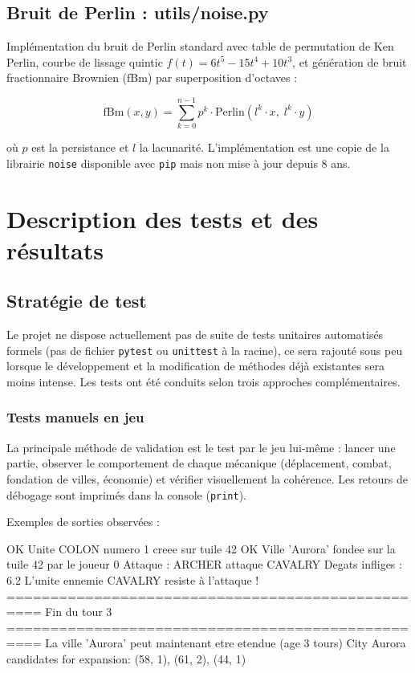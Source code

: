 \documentclass[12pt, a4paper]{article}
\begin{document}
\subsection{Bruit de Perlin : utils/noise.py}

Implémentation du bruit de Perlin standard avec table de permutation de Ken Perlin,
courbe de lissage quintic $f(t) = 6t^5 - 15t^4 + 10t^3$, et génération de bruit fractionnaire
Brownien (fBm) par superposition d'octaves :

\begin{equation}
    \text{fBm}(x, y) = \sum_{k=0}^{n-1} p^k \cdot \text{Perlin}\!\left(l^k \cdot x,\; l^k \cdot y\right)
\end{equation}

où $p$ est la persistance et $l$ la lacunarité. L'implémentation est une copie de la librairie \verb|noise| disponible avec \verb|pip| mais non mise à jour depuis 8 ans.



\section{Description des tests et des résultats}


\subsection{Stratégie de test}

Le projet ne dispose actuellement pas de suite de tests unitaires automatisés formels (pas de fichier
\texttt{pytest} ou \texttt{unittest} à la racine), ce sera rajouté sous peu lorsque le développement et la modification
de méthodes déjà existantes sera moins intense. Les tests ont été conduits selon trois approches complémentaires.

\subsubsection{Tests manuels en jeu}

La principale méthode de validation est le test par le jeu lui-même : lancer une partie,
observer le comportement de chaque mécanique (déplacement, combat, fondation de villes,
économie) et vérifier visuellement la cohérence. Les retours de débogage sont imprimés dans
la console (\texttt{print}).

Exemples de sorties observées :
\begin{myverbatim}[title={Messages de débogage en console}]
OK Unite COLON numero 1 creee sur tuile 42
OK Ville 'Aurora' fondee sur la tuile 42 par le joueur 0
Attaque : ARCHER attaque CAVALRY
   Degats infliges : 6.2
   L'unite ennemie CAVALRY resiste à l'attaque !
==================================================
Fin du tour 3
==================================================
La ville 'Aurora' peut maintenant etre etendue (age 3 tours)
City Aurora candidates for expansion: {(58, 1), (61, 2), (44, 1)}
\end{myverbatim}
\end{document}
